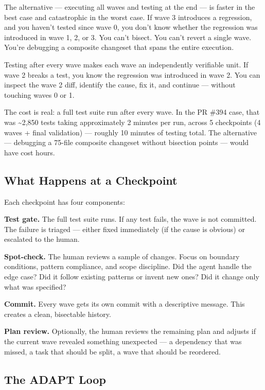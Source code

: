\documentclass[
  a4paper,
  DIV=11,
  numbers=noendperiod]{scrreprt}
\begin{document}
The alternative --- executing all waves and testing at the end --- is
faster in the best case and catastrophic in the worst case. If wave 3
introduces a regression, and you haven't tested since wave 0, you don't
know whether the regression was introduced in wave 1, 2, or 3. You can't
bisect. You can't revert a single wave. You're debugging a composite
changeset that spans the entire execution.

Testing after every wave makes each wave an independently verifiable
unit. If wave 2 breaks a test, you know the regression was introduced in
wave 2. You can inspect the wave 2 diff, identify the cause, fix it, and
continue --- without touching waves 0 or 1.

The cost is real: a full test suite run after every wave. In the PR
\#394 case, that was \textasciitilde2,850 tests taking approximately 2
minutes per run, across 5 checkpoints (4 waves + final validation) ---
roughly 10 minutes of testing total. The alternative --- debugging a
75-file composite changeset without bisection points --- would have cost
hours.

\subsection{What Happens at a
Checkpoint}\label{what-happens-at-a-checkpoint}

Each checkpoint has four components:

\textbf{Test gate.} The full test suite runs. If any test fails, the
wave is not committed. The failure is triaged --- either fixed
immediately (if the cause is obvious) or escalated to the human.

\textbf{Spot-check.} The human reviews a sample of changes. Focus on
boundary conditions, pattern compliance, and scope discipline. Did the
agent handle the edge case? Did it follow existing patterns or invent
new ones? Did it change only what was specified?

\textbf{Commit.} Every wave gets its own commit with a descriptive
message. This creates a clean, bisectable history.

\textbf{Plan review.} Optionally, the human reviews the remaining plan
and adjusts if the current wave revealed something unexpected --- a
dependency that was missed, a task that should be split, a wave that
should be reordered.

\subsection{The ADAPT Loop}\label{the-adapt-loop}
\end{document}
